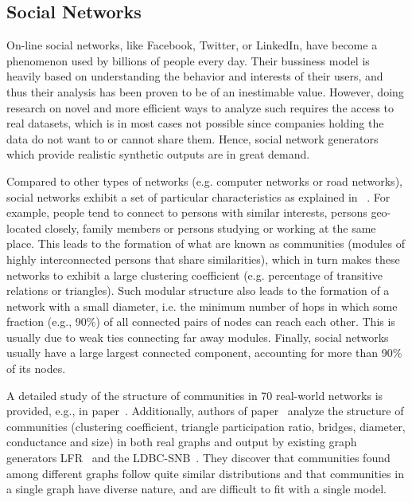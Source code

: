 \subsection{Social Networks}
\label{sec:generators_socialnetworks}

On-line social networks, like Facebook, Twitter, or LinkedIn, have become a
phenomenon used by billions of people every day. Their bussiness model is
heavily based on understanding the behavior and interests of their users, and
thus their analysis has been proven to be of an inestimable value.  However,
doing research on novel and more efficient ways to analyze such requires the
access to real datasets, which is in most cases not possible since companies
holding the data do not want to or cannot share them. Hence, social network
generators which provide realistic synthetic outputs are in great demand.

Compared to other types of networks (e.g. computer networks or road networks),
social networks exhibit a set of particular characteristics as explained in
~\cite{Chakrabarti:2006:GML:1132952.1132954}. For example, people tend to
connect to persons with similar interests, persons geo-located closely, family
members or persons studying or working at the same place. This leads to the
formation of what are known as communities (modules of highly interconnected
persons that share similarities), which in turn makes these networks to exhibit
a large clustering coefficient (e.g. percentage of transitive relations or
triangles).  Such modular structure also leads to the formation of a network
with a small diameter, i.e. the minimum number of hops in which some fraction
(e.g., 90\%) of all connected pairs of nodes can reach each other. This is
usually due to weak ties connecting far away modules. Finally, social networks
usually have a large largest connected component, accounting for more than 90\%
of its nodes. 

A detailed study of the structure of communities in 70 real-world networks is
provided, e.g., in paper~\cite{Leskovec:2008:SPC:1367497.1367591}. Additionally,
authors of paper~\cite{Prat-Perez:2014:CSS:2621934.2621942} analyze the
structure of communities (clustering coefficient, triangle participation ratio,
bridges, diameter, conductance and size) in both real graphs and output by
existing graph generators LFR~\cite{PhysRevE.78.046110} and the
LDBC-SNB~\cite{Erling:2015:LSN:2723372.2742786}. They discover that communities
found among different graphs follow quite similar distributions and that
communities in a single graph have diverse nature, and are difficult to fit with
a single model.

